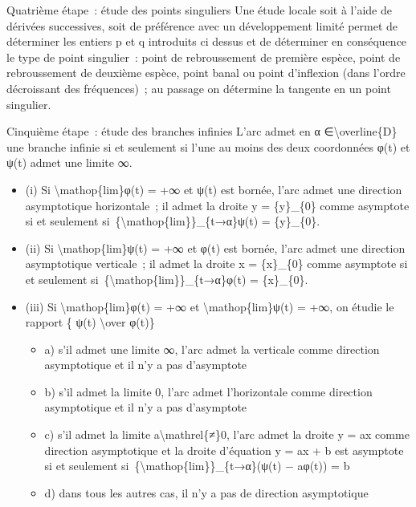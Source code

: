 \documentclass[]{article}
\begin{document}
Quatrième étape~: étude des points singuliers Une étude locale soit à
l'aide de dérivées successives, soit de préférence avec un développement
limité permet de déterminer les entiers p et q introduits ci dessus et
de déterminer en conséquence le type de point singulier~: point de
rebroussement de première espèce, point de rebroussement de deuxième
espèce, point banal ou point d'inflexion (dans l'ordre décroissant des
fréquences)~; au passage on détermine la tangente en un point singulier.

Cinquième étape~: étude des branches infinies L'arc admet en α
∈\textbackslash{}overline\{D\} une branche infinie si et seulement si
l'une au moins des deux coordonnées φ(t) et ψ(t) admet une limite ∞.

\begin{itemize}
\itemsep1pt\parskip0pt
\item
  (i) Si \textbackslash{}mathop\{lim\}\textbar{}φ(t)\textbar{} = +∞ et
  ψ(t) est bornée, l'arc admet une direction asymptotique horizontale~;
  il admet la droite y = \{y\}\_\{0\} comme asymptote si et seulement
  si~\{\textbackslash{}mathop\{lim\}\}\_\{t→α\}ψ(t) = \{y\}\_\{0\}.
\item
  (ii) Si \textbackslash{}mathop\{lim\}\textbar{}ψ(t)\textbar{} = +∞ et
  φ(t) est bornée, l'arc admet une direction asymptotique verticale~; il
  admet la droite x = \{x\}\_\{0\} comme asymptote si et seulement
  si~\{\textbackslash{}mathop\{lim\}\}\_\{t→α\}φ(t) = \{x\}\_\{0\}.
\item
  (iii) Si \textbackslash{}mathop\{lim\}\textbar{}φ(t)\textbar{} = +∞ et
  \textbackslash{}mathop\{lim\}\textbar{}ψ(t)\textbar{} = +∞, on étudie
  le rapport \{ ψ(t) \textbackslash{}over φ(t)\}

  \begin{itemize}
  \itemsep1pt\parskip0pt
  \item
    a) s'il admet une limite ∞, l'arc admet la verticale comme direction
    asymptotique et il n'y a pas d'asymptote
  \item
    b) s'il admet la limite 0, l'arc admet l'horizontale comme direction
    asymptotique et il n'y a pas d'asymptote
  \item
    c) s'il admet la limite a\textbackslash{}mathrel\{≠\}0, l'arc admet
    la droite y = ax comme direction asymptotique et la droite
    d'équation y = ax + b est asymptote si et seulement
    si~\{\textbackslash{}mathop\{lim\}\}\_\{t→α\}(ψ(t) − aφ(t)) = b
  \item
    d) dans tous les autres cas, il n'y a pas de direction asymptotique
  \end{itemize}
\end{itemize}
\end{document}

